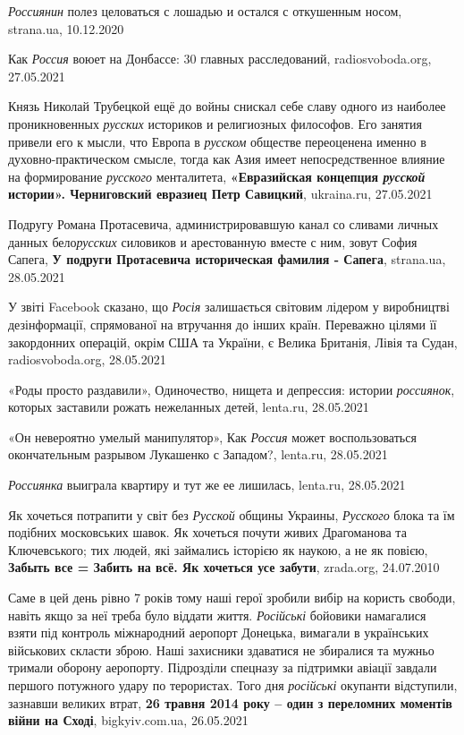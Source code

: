 \emph{Россиянин} полез целоваться с лошадью и остался с откушенным носом, strana.ua, 10.12.2020

Как \emph{Россия} воюет на Донбассе: 30 главных расследований,
radiosvoboda.org, 27.05.2021

Князь Николай Трубецкой ещё до войны снискал себе славу одного из наиболее
проникновенных \emph{русских} историков и религиозных философов. Его занятия
привели его к мысли, что Европа в \emph{русском} обществе переоценена именно в
духовно-практическом смысле, тогда как Азия имеет непосредственное влияние на
формирование \emph{русского} менталитета, \textbf{«Евразийская концепция
\emph{русской} истории». Черниговский евразиец Петр Савицкий}, ukraina.ru,
27.05.2021

Подругу Романа Протасевича, администрировавшую канал со сливами личных данных
бело\emph{русских} силовиков и арестованную вместе с ним, зовут София Сапега,
\textbf{У подруги Протасевича историческая фамилия - Сапега}, strana.ua,
28.05.2021

У звіті Facebook сказано, що \emph{Росія} залишається світовим лідером у
виробництві дезінформації, спрямованої на втручання до інших країн. Переважно
цілями її закордонних операцій, окрім США та України, є Велика Британія, Лівія
та Судан, radiosvoboda.org, 28.05.2021

«Роды просто раздавили», Одиночество, нищета и депрессия: истории
\emph{россиянок}, которых заставили рожать нежеланных детей, lenta.ru,
28.05.2021

«Он невероятно умелый манипулятор», Как \emph{Россия} может воспользоваться
окончательным разрывом Лукашенко с Западом?, lenta.ru, 28.05.2021

\emph{Россиянка} выиграла квартиру и тут же ее лишилась, lenta.ru, 28.05.2021

Як хочеться потрапити у світ без \emph{Русской} общины Украины, \emph{Русского}
блока та їм подібних московських шавок.  Як хочеться почути живих Драгоманова
та Ключевського; тих людей, які займались історією як наукою, а не як повією,
\textbf{Забыть все = Забить на всё. Як хочеться усе забути}, zrada.org,
24.07.2010

Саме в цей день рівно 7 років тому наші герої зробили вибір на користь свободи,
навіть якщо за неї треба було віддати життя. \emph{Російські} бойовики
намагалися взяти під контроль міжнародний аеропорт Донецька, вимагали в
українських військових скласти зброю. Наші захисники здаватися не збиралися та
мужньо тримали оборону аеропорту. Підрозділи спецназу за підтримки авіації
завдали першого потужного удару по терористах. Того дня \emph{російські}
окупанти відступили, зазнавши великих втрат, \textbf{26 травня 2014 року – один
з переломних моментів війни на Сході}, bigkyiv.com.ua, 26.05.2021

